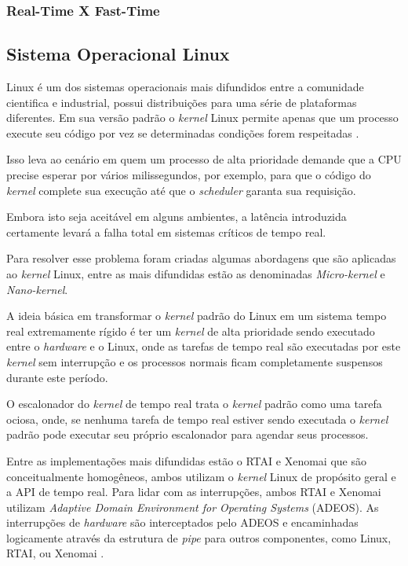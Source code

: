 \documentclass[conference]{IEEEtran}
\begin{document}
\subsubsection{Real-Time X Fast-Time}

\subsection{Sistema Operacional Linux}\label{subsec:so_linux}

Linux é um dos sistemas operacionais mais difundidos entre a comunidade cientifica e industrial, possui distribuições para uma série de plataformas diferentes. Em sua versão padrão o \textit{kernel} Linux permite apenas que um processo execute seu código por vez se determinadas condições forem respeitadas \cite{build_xenobuntu}. 

Isso leva ao cenário em quem um processo de alta prioridade demande que a CPU precise esperar por vários milissegundos, por exemplo, para que o código do \textit{kernel} complete sua execução até que o \textit{scheduler} garanta sua requisição.

Embora isto seja aceitável em alguns ambientes, a latência introduzida certamente levará a falha total em sistemas críticos de tempo real. 

Para resolver esse problema foram criadas algumas abordagens que são aplicadas ao \textit{kernel} Linux, entre as mais difundidas estão as denominadas \textit{Micro-kernel} e \textit{Nano-kernel}.

A ideia básica em transformar o \textit{kernel} padrão do Linux em um sistema tempo real extremamente rígido é ter um \textit{kernel} de alta prioridade sendo executado entre o \textit{hardware} e o Linux, onde as tarefas de tempo real são executadas por este \textit{kernel} sem interrupção e os processos normais ficam completamente suspensos durante este período.

O escalonador do \textit{kernel} de tempo real trata o \textit{kernel} padrão como uma tarefa ociosa, onde, se nenhuma tarefa de tempo real estiver sendo executada o \textit{kernel} padrão pode executar seu próprio escalonador para agendar seus processos.

Entre as implementações mais difundidas estão o RTAI e Xenomai que são conceitualmente homogêneos, ambos utilizam o \textit{kernel} Linux de propósito geral e a API de tempo real.
Para lidar com as interrupções, ambos RTAI e Xenomai utilizam \textit{Adaptive Domain Environment for Operating Systems} (ADEOS). As interrupções de \textit{hardware} são interceptados pelo ADEOS e encaminhadas logicamente através da estrutura de \textit{pipe} para outros componentes, como Linux, RTAI, ou Xenomai \cite{ADEOS}.
\end{document}
